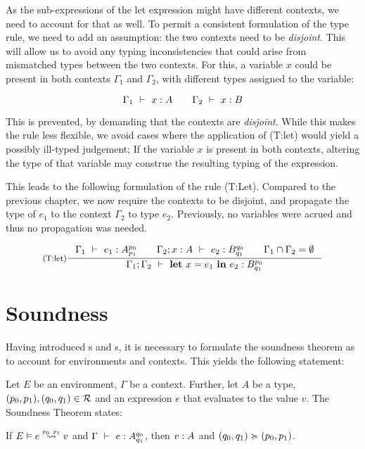 \begin{remark}
   As the sub-expressions of the let expression might have different contexts, we need to account for that as well. To permit a consistent formulation of the type rule, we need to add an assumption: the two contexts need to be \emph{disjoint}. This will allow us to avoid any typing inconsistencies that could arise from mismatched types between the two contexts. 
   For this, a variable \(x\) could be present in both contexts \(\Gamma_1\) and \(\Gamma_2\), with different types assigned to the variable:

   \[
      \Gamma_1~\vdash~x:A \qquad \Gamma_2~\vdash~x:B
   \]

   This is prevented, by demanding that the contexts are \emph{disjoint}. While this makes the rule less flexible, we avoid cases where the application of (T:let) would yield a possibly ill-typed judgement; If the variable \(x\) is present in both contexts, altering the type of that variable may construe the resulting typing of the expression.
\end{remark}

This leads to the following formulation of the rule (T:Let). Compared to the previous chapter, we now require the contexts to be disjoint, and propagate the type of \(e_1\) to the context \(\Gamma_2\) to type \(e_2\). Previously, no variables were acrued and thus no propagation was needed.

\[
   \inference[(T:let)]
   {\typing{\Gamma_1}{e_1}{\ratype{A}{p_0}{p_1}} \qquad \typing{\Gamma_2;x : A}{e_2}{\ratype{B}{q_0}{q_1}} \qquad \Gamma_1 \cap \Gamma_2 = \emptyset}
   {\typing{\Gamma_1; \Gamma_2}{\letexp{x}{e_1}{e_2}}{\ratype{B}{p_0}{q_1}}}
\]


\section{Soundness}

Having introduced s and s, it is necessary to formulate the soundness theorem as to account for environments and contexts. This yields the following statement:

\begin{theorem}\label{thm:soundness-5}
   Let \(E\) be an environment, \(\Gamma\) be a context. Further, let \(A\) be a type, \((p_0, p_1), (q_0, q_1) \in \mathcal{R}\) and an expression \(e\) that evaluates to the value \(v\). The Soundness Theorem states:

   \begin{center}
   If \(\evals{E}{e}{v}{p_0}{p_1}\) and \(\Gamma~\vdash~e:A ^{q_0}_{q_1}\), then \(v : A ^{}_{}\) and \((q_0, q_1) \succcurlyeq (p_0, p_1)\).
   \end{center}
\end{theorem}

